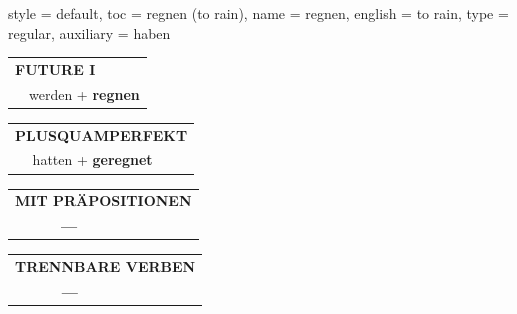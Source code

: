 \begin{verbentry}{
  style = {default},
  toc = {regnen (to rain)},
  name = {regnen},
  english = {to rain},
  type = {regular},
  auxiliary = {haben}
}
\begin{tabular}{rl}
    \multicolumn{2}{l}{\textbf{FUTURE I} }\\
  &  werden + \textbf{regnen}\\
 
  \end{tabular}
\hfill
   \begin{tabular}{rl}
      \multicolumn{2}{l}{\textbf{PLUSQUAMPERFEKT}}\\
  &  hatten + \textbf{geregnet}\\
  \end{tabular}
  
  \vspace{10pt}



\begin{tabular}{lll}
\multicolumn{3}{l}{\textbf{MIT PRÄPOSITIONEN}}\\
& \textbf{---} & \\
\end{tabular}
\hfill
\begin{tabular}{lll}
\multicolumn{3}{l}{\textbf{TRENNBARE VERBEN}}\\
& \textbf{---} & \\
\end{tabular}

  \vspace{-5pt}
\end{verbentry}

